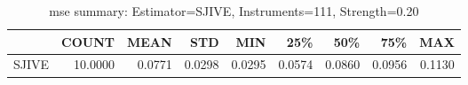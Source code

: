\begin{table}[ht]
\centering
\caption{mse summary: Estimator=SJIVE, Instruments=111, Strength=0.20}
\begin{tabular}{lrrrrrrrr}
\toprule
 & COUNT & MEAN & STD & MIN & 25\% & 50\% & 75\% & MAX \\
\midrule
SJIVE & 10.0000 & 0.0771 & 0.0298 & 0.0295 & 0.0574 & 0.0860 & 0.0956 & 0.1130 \\
\bottomrule
\end{tabular}
\end{table}
